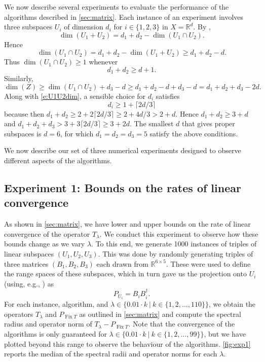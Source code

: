\documentclass[11pt]{article}
\newcommand{\tmenge}[2]{\{{#1}~\big |~{#2}\}}
\newcommand{\RR}{\ensuremath{\mathbb R}}
\newcommand{\Fix}{\ensuremath{\operatorname{Fix}}}
\theoremstyle{definition}
\providecommand{\RR}{\mathbb{R}}
\providecommand{\RR}{\mathbb{R}}
\begin{document}
{\label{sec:numexp}


We now describe several experiments to evaluate the performance 
of the algorithms described in \cref{sec:matrix}. 
Each instance of an experiment involves three subspaces $U_i$ of dimension $d_i$ for $i\in\{1,2,3\}$ in $X=\RR^d$. 
By \cite[equation~(4.419) on page~205]{Meyer}, 
\begin{equation*}
\dim(U_1+ U_2)=d_1+d_2-\dim(U_1\cap U_2).
\end{equation*}
Hence
\begin{equation*}
\dim(U_1\cap U_2)=d_1+d_2-\dim(U_1+U_2)\geq d_1+d_2-d.
\end{equation*}
Thus $\dim(U_1\cap U_2)\geq 1$ whenever 
\begin{equation}\label{e:U1U2dim}
d_1+d_2\geq d+1.
\end{equation}
Similarly, 
\begin{equation*}
\dim(Z)\geq \dim(U_1\cap U_2)+d_3-d\geq d_1+d_2-d+d_3-d=d_1+d_2+d_3-2d.
\end{equation*}
Along with \cref{e:U1U2dim}, a sensible choice for $d_i$ satisfies 
\begin{equation*}
d_i\geq 1+\lceil2d/3\rceil
\end{equation*}
because then $d_1+d_2\geq 2+2\lceil 2d/3\rceil\geq 2+4d/3>2+d$. 
Hence $d_1+d_2\geq 3+d$ and $d_1+d_2+d_3> 3+3\lceil 2d/3\rceil\geq 3+2d$. 
The smallest $d$ that gives proper subspaces 
is $d=6$, for which $d_1=d_2=d_3=5$ satisfy the above conditions.

We now describe our set of three numerical experiments designed to 
observe different aspects of the algorithms. 

\subsection{Experiment 1: Bounds on the rates of linear convergence}

As shown in \cref{sec:matrix}, we have lower and upper bounds on the rate of 
linear convergence of the operator $T_\lambda$. 
We conduct this experiment to observe how these bounds change as we vary 
$\lambda$.  To this end, we 
generate 1000 instances of triples of linear subspaces $(U_1,U_2,U_3)$. 
This was done by randomly generating triples of three matrices 
$(B_1,B_2,B_3)$ each drawn from $\RR^{6\times 5}$. 
These were used to define the range spaces of these subspaces, 
which in turn gave us the projection onto $U_i$ 
(using, e.g., \cite[Proposition~3.30(ii)]{BC2017}) as 
\begin{equation*}
P_{U_i}=B_iB_i^\dagger.
\end{equation*}
For each instance, algorithm, and $\lambda\in 
\tmenge{0.01\cdot k}{k\in\{1,2,\ldots,110\}}$, 
we obtain the operators $T_\lambda$ and $P_{\Fix T}$ as outlined in \cref{sec:matrix} 
and compute the spectral radius and operator norm of 
$T_\lambda-P_{\Fix T}$. 
Note that the convergence of the algorithms is only guaranteed for $\lambda\in 
\tmenge{0.01\cdot k}{k\in\{1,2,\ldots,99\}}$, 
but we have plotted beyond this range 
to observe the behaviour of the algorithms. 
\cref{fig:exp1} reports the median of the spectral radii and operator norms for each $\lambda$. 

}
\end{document}

